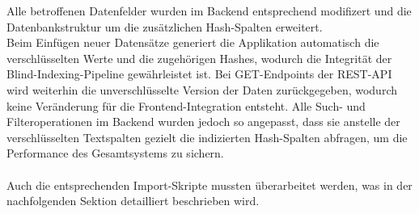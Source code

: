 Alle betroffenen Datenfelder wurden im Backend entsprechend modifizert und die Datenbankstruktur um die zusätzlichen Hash-Spalten erweitert. 
\\
Beim Einfügen neuer Datensätze generiert die Applikation automatisch die verschlüsselten Werte und die zugehörigen Hashes, wodurch die Integrität der Blind-Indexing-Pipeline gewährleistet ist.
Bei GET-Endpoints der REST-API wird weiterhin die unverschlüsselte Version der Daten zurückgegeben, wodurch keine Veränderung für die Frontend-Integration entsteht. 
Alle Such- und Filteroperationen im Backend wurden jedoch so angepasst, dass sie anstelle der verschlüsselten Textspalten gezielt die indizierten Hash-Spalten abfragen, um die Performance des Gesamtsystems zu sichern.
\\
\\
Auch die entsprechenden Import-Skripte mussten überarbeitet werden, was in der nachfolgenden Sektion detailliert beschrieben wird.
